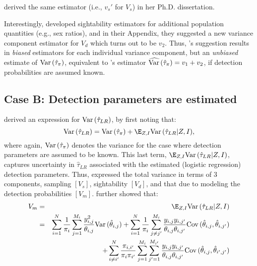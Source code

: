\documentclass[nojss]{jss}
\def\VAR{{\rm Var}\,}
\def\COV{{\rm Cov}\,}
\begin{document}
\citet{Wong1996} derived the same estimator (i.e., $v_{s}'$ for $V_{s}$) in her Ph.D. dissertation.

Interestingly, \citet{samuel1992} developed sightability estimators
for additional population quantities (e.g., sex ratios), and in
their Appendix, they suggested a new variance component estimator
for $V_{d}$ which turns out to be $v_{2}$.  Thus,
\citet{samuel1992}'s suggestion results in \emph{biased} estimators
for each individual variance component, but an \emph{unbiased}
estimate of $\VAR(\hat{\tau}_{\pi})$, equivalent to
\citet{thompsonSeb1996}'s estimator
$\widehat{\VAR}(\hat{\tau}_{\pi}) = v_{1}+v_{2}$, if detection
probabilities are assumed known.

\subsection{Case B:  Detection parameters are estimated}

\citet{SS1989} derived an expression for $\VAR(\hat{\tau}_{LR})$, by
first noting that:
\begin{equation}
\VAR(\hat{\tau}_{LR}) =
\VAR(\hat{\tau}_{\pi})+\E_{Z,I}\VAR(\hat{\tau}_{LR}|Z,I),
\end{equation}
where again, $\VAR(\hat{\tau}_{\pi})$ denotes the variance for the
case where detection parameters are assumed to be known. This last
term, $\E_{Z,I}\VAR(\hat{\tau}_{LR}|Z,I)$, captures uncertainty in
$\hat{\tau}_{LR}$ associated with the estimated (logistic
regression) detection parameters. Thus, \citet{SS1989} expressed the
total variance in terms of 3 components, sampling $[V_{s}]$,
sightability $[V_{d}]$, and that due to modeling the detection
probabilities $[V_{m}]$.  \citet{SS1989} further showed that:
\begin{eqnarray}
V_{m} & = & \E_{Z,I}\VAR(\hat{\tau}_{LR}|Z,I) \nonumber \\
&= &
\sum_{i=1}^{N}\frac{1}{\pi_{i}}\sum_{j=1}^{M_{i}}\frac{y_{i,j}^2}{\theta_{i,j}}\VAR(\hat{\theta}_{i,j})+
\sum_{i=1}^{N}\frac{1}{\pi_{i}}\sum_{j \neq j'}^{M_{i}}\frac{y_{i,j}y_{i,j'}}{\theta_{i,j}\theta_{i,j'}}\COV(\hat{\theta}_{i,j},\hat{\theta}_{i,j'}) \nonumber \\
  & & + \sum_{i \neq i'}^{N}\frac{\pi_{i,i'}}{\pi_{i}\pi_{i'}}\sum_{j=1}^{M_{i}}\sum_{j '=1}^{M_{i'}}\frac{y_{i,j}y_{i,j'}}{\theta_{i,j}\theta_{i,j'}}\COV(\hat{\theta}_{i,j},\hat{\theta}_{i',j'})
\end{eqnarray}
\end{document}
